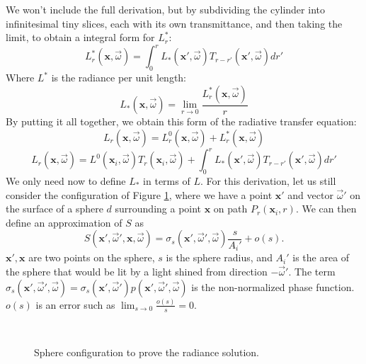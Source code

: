 We won't include the full derivation, but by subdividing the cylinder into infinitesimal tiny slices, each with its own transmittance, and then taking the limit, to obtain a integral form for $L_r^*$:
\begin{equation*}
L_r^*(\mathbf{x}, \vec{\omega}) = \int_0^r L_*(\mathbf{x}', \vec{\omega}) T_{r-r'}(\mathbf{x}', \vec{\omega})  dr'
\end{equation*}
Where $L^*$ is the radiance per unit length:
\begin{equation*}
L_*(\mathbf{x}, \vec{\omega}) = \lim_{r \rightarrow 0} \frac{L_r^*(\mathbf{x}, \vec{\omega})}{r}
\end{equation*}
By putting it all together, we obtain this form of the radiative transfer equation:
\begin{equation*}
L_r(\mathbf{x}, \vec{\omega}) = L_r^0(\mathbf{x}, \vec{\omega}) + L_r^*(\mathbf{x}, \vec{\omega})
\end{equation*}
\begin{equation*}
L_r(\mathbf{x}, \vec{\omega}) =  L^0(\mathbf{x}_i, \vec{\omega}) T_r(\mathbf{x}_i, \vec{\omega}) + \int_0^r L_*(\mathbf{x}', \vec{\omega}) T_{r-r'}(\mathbf{x}', \vec{\omega})  dr'
\end{equation*}
We only need now to define $L_*$ in terms of $L$. For this derivation, let us still consider the configuration of Figure \ref{fig:sphere}, where we have a point $\mathbf{x}'$ and vector $\vec{\omega}'$ on the surface of a sphere $d$ surrounding a point $\mathbf{x}$ on path $P_r(\mathbf{x}_i,r)$. We can then define an approximation of $S$ as
\begin{equation*}
S(\mathbf{x}', \vec{\omega}', \mathbf{x}, \vec{\omega}) = \sigma_s(\mathbf{x}', \vec{\omega}', \vec{\omega}) \frac{s}{A_i'} + o(s).
\end{equation*}
$\mathbf{x}', \mathbf{x}$ are two points on the sphere, $s$ is the sphere radius, and $A_i'$ is the area of the sphere that would be lit by a light shined from direction $-\vec{\omega}'$. The term $\sigma_s(\mathbf{x}', \vec{\omega}', \vec{\omega}) = \sigma_s(\mathbf{x}', \vec{\omega}') p(\mathbf{x}', \vec{\omega}', \vec{\omega})$ is the non-normalized phase function. $o(s)$ is an error such as $\lim_{s\rightarrow 0} \frac{o(s)}{s} = 0$.

\begin{figure}
\centering
   \def\svgwidth{0.8\textwidth}
    \\
\caption{Sphere configuration to prove the radiance solution.} %
\label{fig:sphere}
\end{figure}

